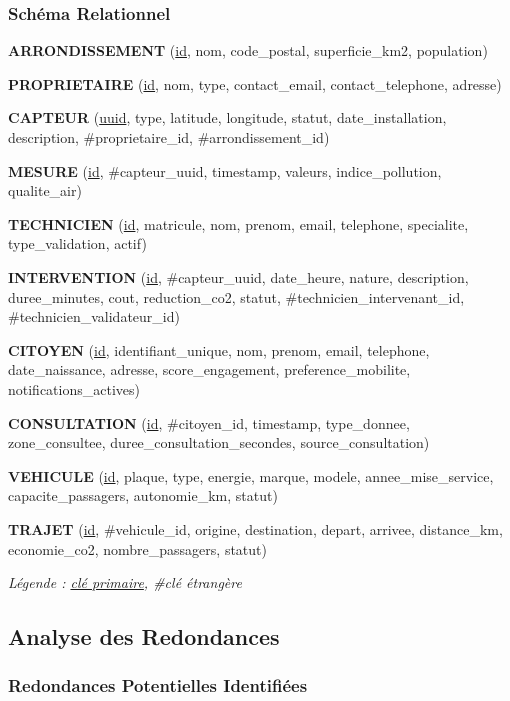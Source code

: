 \documentclass[12pt,a4paper]{article}
\begin{document}
\subsubsection{Schéma Relationnel}

\textbf{ARRONDISSEMENT} (\underline{id}, nom, code\_postal, superficie\_km2, population)

\textbf{PROPRIETAIRE} (\underline{id}, nom, type, contact\_email, contact\_telephone, adresse)

\textbf{CAPTEUR} (\underline{uuid}, type, latitude, longitude, statut, date\_installation, description, \#proprietaire\_id, \#arrondissement\_id)

\textbf{MESURE} (\underline{id}, \#capteur\_uuid, timestamp, valeurs, indice\_pollution, qualite\_air)

\textbf{TECHNICIEN} (\underline{id}, matricule, nom, prenom, email, telephone, specialite, type\_validation, actif)

\textbf{INTERVENTION} (\underline{id}, \#capteur\_uuid, date\_heure, nature, description, duree\_minutes, cout, reduction\_co2, statut, \#technicien\_intervenant\_id, \#technicien\_validateur\_id)

\textbf{CITOYEN} (\underline{id}, identifiant\_unique, nom, prenom, email, telephone, date\_naissance, adresse, score\_engagement, preference\_mobilite, notifications\_actives)

\textbf{CONSULTATION} (\underline{id}, \#citoyen\_id, timestamp, type\_donnee, zone\_consultee, duree\_consultation\_secondes, source\_consultation)

\textbf{VEHICULE} (\underline{id}, plaque, type, energie, marque, modele, annee\_mise\_service, capacite\_passagers, autonomie\_km, statut)

\textbf{TRAJET} (\underline{id}, \#vehicule\_id, origine, destination, depart, arrivee, distance\_km, economie\_co2, nombre\_passagers, statut)

\vspace{0.5cm}
\textit{Légende : \underline{clé primaire}, \#clé étrangère}

\subsection{Analyse des Redondances}

\subsubsection{Redondances Potentielles Identifiées}
\end{document}
